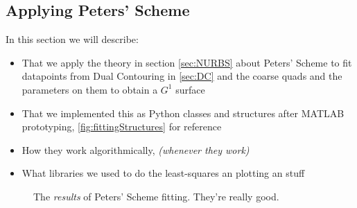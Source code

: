 \subsection{Applying Peters' Scheme}
In this section we will describe:
\begin{itemize}
\item That we apply the theory in section \autoref{sec:NURBS} about Peters' Scheme to fit datapoints from Dual Contouring in \autoref{sec:DC} and the coarse quads and the parameters on them to obtain a $G^1$ surface
\item That we implemented this as Python classes and structures after MATLAB prototyping, \autoref{fig:fittingStructures} for reference
\item How they work algorithmically, \textit{(whenever they work)}
\item What libraries we used to do the least-squares an plotting an stuff
\end{itemize}

\begin{figure}
\label{fig:fittingStructures}
\caption{The \emph{results} of Peters' Scheme fitting. They're really good.}
\end{figure}